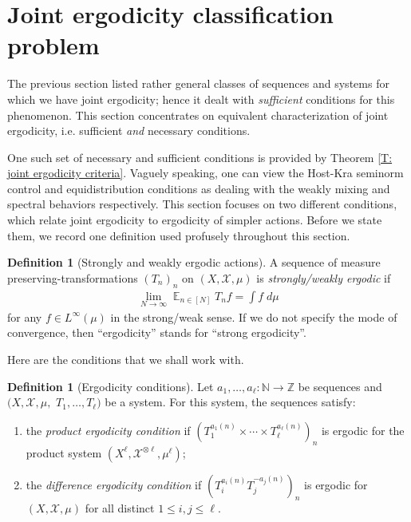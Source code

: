 \documentclass[11pt]{amsart}
\theoremstyle{definition}
\newtheorem{definition}[lemma]{Definition}
\DeclareMathOperator*{\E}{\mathbb{E}}
\newcommand{\N}{{\mathbb N}}
\newcommand{\Z}{{\mathbb Z}}
\newcommand{\CX}{{\mathcal X}}
\newcommand{\1}{{\mathbf{1}}}
\begin{document}
\section{Joint ergodicity classification problem}\label{S: classification problem}
    The previous section listed rather general classes of sequences and systems for which we have joint ergodicity; hence it dealt with \emph{sufficient} conditions for this phenomenon. This section concentrates on equivalent characterization of joint ergodicity, i.e. sufficient \emph{and} necessary conditions. 
    
    One such set of necessary and sufficient conditions is provided by Theorem \ref{T: joint ergodicity criteria}. Vaguely speaking, one can view the Host-Kra seminorm control and equidistribution conditions as dealing with the weakly mixing and spectral behaviors respectively. This section focuses on two different conditions, which relate joint ergodicity to ergodicity of simpler actions. Before we state them, we record one definition used profusely throughout this section.
    \begin{definition}[Strongly and weakly ergodic actions]
        A sequence of measure preserving-transformations $(T_n)_n$ on $(X, \CX, \mu)$ is \emph{strongly/weakly ergodic} if
    \begin{align*}
        \lim_{N\to\infty}\E_{n\in[N]}T_n f = \int f\; d\mu
    \end{align*}
    for any $f\in L^\infty(\mu)$ in the strong/weak sense. If we do not specify the mode of convergence, then ``ergodicity'' stands for ``strong ergodicity''.
    \end{definition}
    Here are the conditions that we shall work with. 
    \begin{definition}[Ergodicity conditions]\label{D: ergodicity conditions}
        Let $a_1,\ldots,a_\ell\colon \N\to \Z$ be sequences and $(X, \CX, \mu,$\! $T_1, \ldots, T_\ell)$ be a system. For this system, the sequences satisfy:
    \begin{enumerate}
    \item the \emph{product ergodicity condition} if  $(T_1^{{a_1(n)}}\times \cdots \times T_\ell^{{a_\ell(n)}})_n$ is ergodic for the product system $(X^\ell, \CX^{\otimes \ell}, \mu^\ell)$;
    \item the \emph{difference ergodicity condition} if $(T_i^{{a_i(n)}}T_j^{-{a_j(n)}})_n$ is ergodic for $(X, \CX, \mu)$ for all distinct $1\leq i, j\leq \ell$.
    \end{enumerate} 
    \end{definition}
\end{document}
